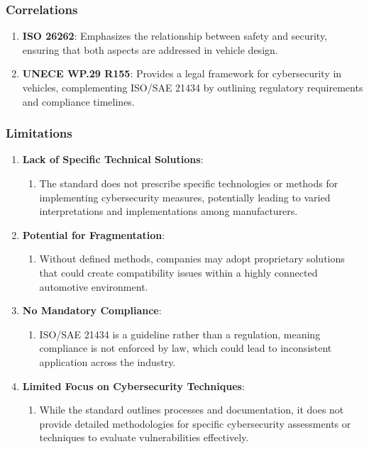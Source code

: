 \subsubsection{Correlations}\label{subsubsec:correlations}

\begin{enumerate}
    \item \textbf{ISO 26262}: Emphasizes the relationship between safety and security, ensuring that both aspects are addressed in vehicle design.
    \item \textbf{UNECE WP.29 R155}: Provides a legal framework for cybersecurity in vehicles, complementing ISO/SAE 21434 by outlining regulatory requirements and compliance timelines.
\end{enumerate}

\subsubsection{Limitations}\label{subsubsec:limitations}

\begin{enumerate}
    \item \textbf{Lack of Specific Technical Solutions}:
    \begin{enumerate}
        \item The standard does not prescribe specific technologies or methods for implementing cybersecurity measures, potentially leading to varied interpretations and implementations among manufacturers.
    \end{enumerate}

    \item \textbf{Potential for Fragmentation}:
    \begin{enumerate}
        \item Without defined methods, companies may adopt proprietary solutions that could create compatibility issues within a highly connected automotive environment.
    \end{enumerate}

    \item \textbf{No Mandatory Compliance}:
    \begin{enumerate}
        \item ISO/SAE 21434 is a guideline rather than a regulation, meaning compliance is not enforced by law, which could lead to inconsistent application across the industry.
    \end{enumerate}

    \item \textbf{Limited Focus on Cybersecurity Techniques}:
    \begin{enumerate}
        \item While the standard outlines processes and documentation, it does not provide detailed methodologies for specific cybersecurity assessments or techniques to evaluate vulnerabilities effectively.
    \end{enumerate}
\end{enumerate}

